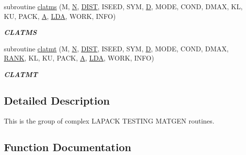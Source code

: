 \begin{DoxyCompactItemize}
subroutine \hyperlink{group__complex__matgen_ga411f64e8d8b980e985c6b0189139dc49}{clatms} (M, \hyperlink{polmisc_8c_a0240ac851181b84ac374872dc5434ee4}{N}, \hyperlink{superlu__enum__consts_8h_af00a42ecad444bbda75cde1b64bd7e72ac04fbbdf0d80a4ad25e565541deeebd7}{D\+I\+S\+T}, I\+S\+E\+E\+D, S\+Y\+M, \hyperlink{odrpack_8h_a7dae6ea403d00f3687f24a874e67d139}{D}, M\+O\+D\+E, C\+O\+N\+D, D\+M\+A\+X, K\+L, K\+U, P\+A\+C\+K, \hyperlink{classA}{A}, \hyperlink{example__user_8c_ae946da542ce0db94dced19b2ecefd1aa}{L\+D\+A}, W\+O\+R\+K, I\+N\+F\+O)
\begin{DoxyCompactList}\small\item\em {\bfseries C\+L\+A\+T\+M\+S} \end{DoxyCompactList}\item 
subroutine \hyperlink{group__complex__matgen_gacbcffc07d8119265fdd7ec81f961e75a}{clatmt} (M, \hyperlink{polmisc_8c_a0240ac851181b84ac374872dc5434ee4}{N}, \hyperlink{superlu__enum__consts_8h_af00a42ecad444bbda75cde1b64bd7e72ac04fbbdf0d80a4ad25e565541deeebd7}{D\+I\+S\+T}, I\+S\+E\+E\+D, S\+Y\+M, \hyperlink{odrpack_8h_a7dae6ea403d00f3687f24a874e67d139}{D}, M\+O\+D\+E, C\+O\+N\+D, D\+M\+A\+X, \hyperlink{splinemodule_8c_a3a88bcc63386de30443dacede2e01847}{R\+A\+N\+K}, K\+L, K\+U, P\+A\+C\+K, \hyperlink{classA}{A}, \hyperlink{example__user_8c_ae946da542ce0db94dced19b2ecefd1aa}{L\+D\+A}, W\+O\+R\+K, I\+N\+F\+O)
\begin{DoxyCompactList}\small\item\em {\bfseries C\+L\+A\+T\+M\+T} \end{DoxyCompactList}\end{DoxyCompactItemize}


\subsection{Detailed Description}
This is the group of complex L\+A\+P\+A\+C\+K T\+E\+S\+T\+I\+N\+G M\+A\+T\+G\+E\+N routines. 

\subsection{Function Documentation}
\hypertarget{group__complex__matgen_ga01a45e71da04e1130918ab95dbcd08c7}{}
